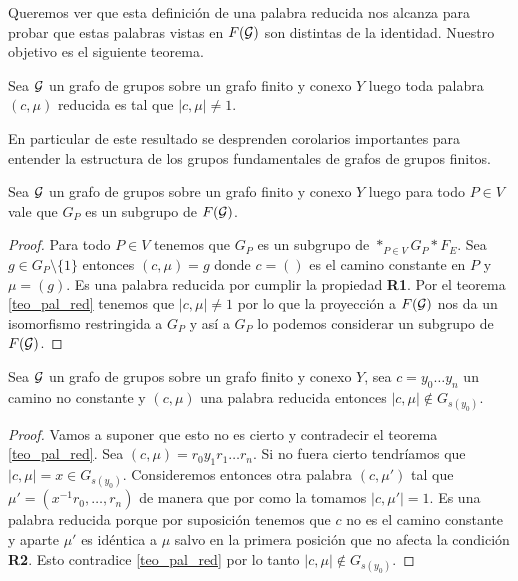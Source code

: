 \documentclass[tesis.tex]{subfiles}
\begin{document}
Queremos ver que esta definición de una palabra reducida nos alcanza para probar que estas palabras vistas en $F({\cal G})$ son distintas de la identidad.
Nuestro objetivo es el siguiente teorema.

\begin{teo}\label{teo_pal_red}
	Sea ${\cal G}$ un grafo de grupos sobre un grafo finito y conexo $Y$ luego toda palabra $(c, \mu)$ reducida es tal que $|c,\mu| \neq 1$.
\end{teo}

En particular de este resultado se desprenden corolarios importantes para entender la estructura de los grupos fundamentales de grafos de grupos finitos.

\begin{coro}\label{coro_pal_red_1}
	Sea ${\cal G}$ un grafo de grupos sobre un grafo finito y conexo $Y$ luego para todo $P \in V$ vale que $G_P$ es un subgrupo de $F({\cal G})$.
\end{coro}
\begin{proof}
	Para todo $P \in V$ tenemos que $G_P$ es un subgrupo de $\ast_{P \in V} G_P \ast F_E$.
	Sea  $g \in G_{P} \setminus \{ 1 \}$ entonces $(c, \mu) = g$ donde $c = ()$ es el camino constante en $P$ y $\mu = (g)$.
	Es una palabra reducida por cumplir la propiedad \textbf{R1}.
	Por el teorema \ref{teo_pal_red} tenemos que $|c,\mu| \neq 1$ por lo que  la proyección a $F({\cal G})$ nos da un isomorfismo restringida a $G_P$ y así a $G_P$ lo podemos considerar un subgrupo de $F({\cal G})$.
\end{proof}

\begin{coro}\label{coro_pal_red_2}
	Sea ${\cal G}$ un grafo de grupos sobre un grafo finito y conexo $Y$, sea $c = y_0 \dots y_n$ un camino no constante y $(c, \mu)$ una palabra reducida entonces $|c, \mu| \notin G_{s(y_0)}$.
\end{coro}
\begin{proof}
	Vamos a suponer que esto no es cierto y contradecir el teorema \ref{teo_pal_red}.
	Sea $(c, \mu) = r_0y_1r_1\dots r_n$.
	Si no fuera cierto tendríamos que $|c,\mu| = x \in G_{s(y_0)}$. 
	Consideremos entonces otra palabra $(c,\mu')$ tal que $\mu' = (x^{-1}r_0, \dots, r_n)$ de manera que por como la tomamos $|c,\mu'| = 1$.
	Es una palabra reducida porque por suposición tenemos que $c$ no es el camino constante y aparte $\mu'$ es idéntica a $\mu$ salvo en la primera posición que no afecta la condición \textbf{R2}.
	Esto contradice \ref{teo_pal_red} por lo tanto $|c, \mu| \notin G_{s(y_0)}$.
\end{proof}
\end{document}
